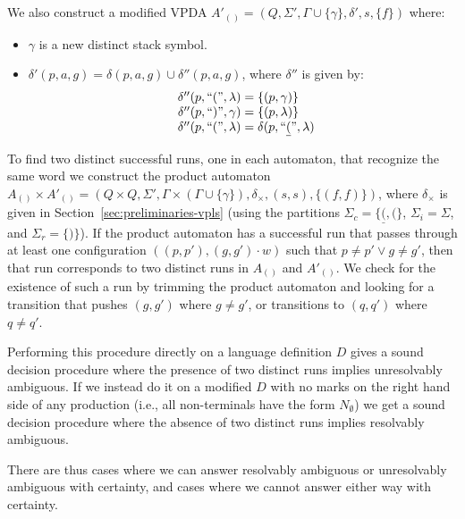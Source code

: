 \documentclass[acmsmall,review,anonymous]{acmart}\settopmatter{printfolios=true,printccs=false,printacmref=false}
\newcommand{\T}{\Sigma} %
\newcommand{\reqpl}{\underline{(}}
\newcommand{\reqpr}{)}
\newcommand{\pospl}{(}
\newcommand{\pospr}{)}
\newcommand{\posp}[1]{\pospl#1\pospr}
\begin{document}
\noindent We also construct a modified VPDA $A'_{\posp{}} = (Q, \T', \Gamma \cup \{\gamma\}, \delta', s, \{f\})$ where:

\begin{itemize}
\item $\gamma$ is a new distinct stack symbol.
\item $\delta'(p, a, g) = \delta(p, a, g) \cup \delta''(p, a, g)$, where $\delta''$ is given by:
  $$
  \begin{array}{r@{\;=\;}l@{}}
    \delta''(p, \text{``}\pospl\text{''}, \lambda)
    & \{ (p, \gamma) \} \\

    \delta''(p, \text{``}\pospr\text{''}, \gamma)
    & \{ (p, \lambda) \} \\

    \delta''(p, \text{``}\pospl\text{''}, \lambda)
    & \delta(p, \text{``}\reqpl\text{''}, \lambda) \\
  \end{array}
  $$
\end{itemize}

\noindent To find two distinct successful runs, one in each automaton, that recognize the same word we construct the product automaton $A_{\posp{}} \times A'_{\posp{}} = (Q \times Q, \T', \Gamma \times (\Gamma \cup \{\gamma\}), \delta_{\times}, (s, s), \{(f, f)\})$, where $\delta_{\times}$ is given in Section~\ref{sec:preliminaries-vpls} (using the partitions $\T_c = \{ \reqpl, \pospl \}$, $\T_i = \T$, and $\T_r = \{\reqpr\}$). If the product automaton has a successful run that passes through at least one configuration $((p, p'), (g, g')\cdot w)$ such that $p \neq p' \lor g \neq g'$, then that run corresponds to two distinct runs in $A_{\posp{}}$ and $A'_{\posp{}}$. We check for the existence of such a run by trimming the product automaton and looking for a transition that pushes $(g, g')$ where $g \neq g'$, or transitions to $(q, q')$ where $q \neq q'$.

Performing this procedure directly on a language definition $D$ gives a sound decision procedure where the presence of two distinct runs implies unresolvably ambiguous. If we instead do it on a modified $D$ with no marks on the right hand side of any production (i.e., all non-terminals have the form $N_\emptyset$) we get a sound decision procedure where the absence of two distinct runs implies resolvably ambiguous.

There are thus cases where we can answer resolvably ambiguous or unresolvably ambiguous with certainty, and cases where we cannot answer either way with certainty.
\end{document}
